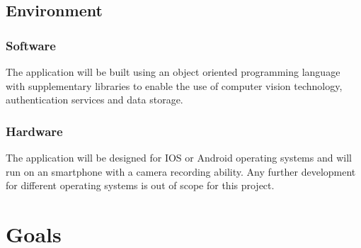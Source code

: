 \documentclass{article}
\begin{document}
\subsection{Environment}
  \subsubsection{Software}
    The application will be built using an object oriented programming language with supplementary libraries to enable the use of computer vision technology, authentication services and data storage.
  \subsubsection{Hardware}
    The application will be designed for IOS or Android operating systems and will run on an smartphone with a camera recording ability. Any further development for different operating systems is out of scope for this project. 
    
\section{Goals}
\end{document}
